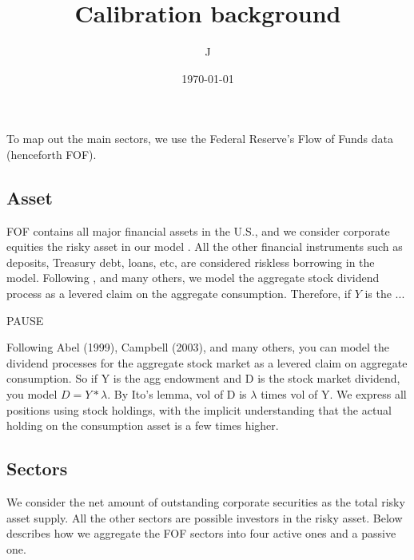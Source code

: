 \documentclass[pdftex,12pt,a4paper]{article}
\begin{document}
\title{Calibration background}
\author{J}
\date{\today}
\maketitle

\abstract 
\setlength{\parindent}{0pt}
\setlength{\parskip}{0.5\baselineskip}

To map out the main sectors, we use the Federal Reserve's Flow of Funds data (henceforth FOF). 

\subsection{Asset} 
FOF contains all major financial assets in the U.S., and we consider corporate equities the risky asset in our model \cite{he2013intermediary,Kargar/2021}. All the other financial instruments such as deposits, Treasury debt, loans, etc, are considered riskless borrowing in the model. Following \cite{abel1999risk,campbell2003consumption}, and many others, we model the aggregate stock dividend process as a levered claim on the aggregate consumption. Therefore, if $Y$ is the ... 

PAUSE

Following Abel (1999), Campbell (2003), and
many others, you can model the dividend processes for the aggregate stock market as a levered claim on aggregate consumption. So if Y is the agg endowment and D is the stock market dividend, you model $D = Y * \lambda$. By Ito’s lemma, vol of D is $\lambda$ times vol of Y. We express all positions using stock holdings, with the implicit understanding that the actual holding on the consumption asset is a few times higher. 


\subsection{Sectors}
We consider the net amount of outstanding corporate securities as the total risky asset supply. All the other sectors are possible investors in the risky asset. Below describes how we aggregate the FOF sectors into four active ones and a passive one. 
\end{document}
